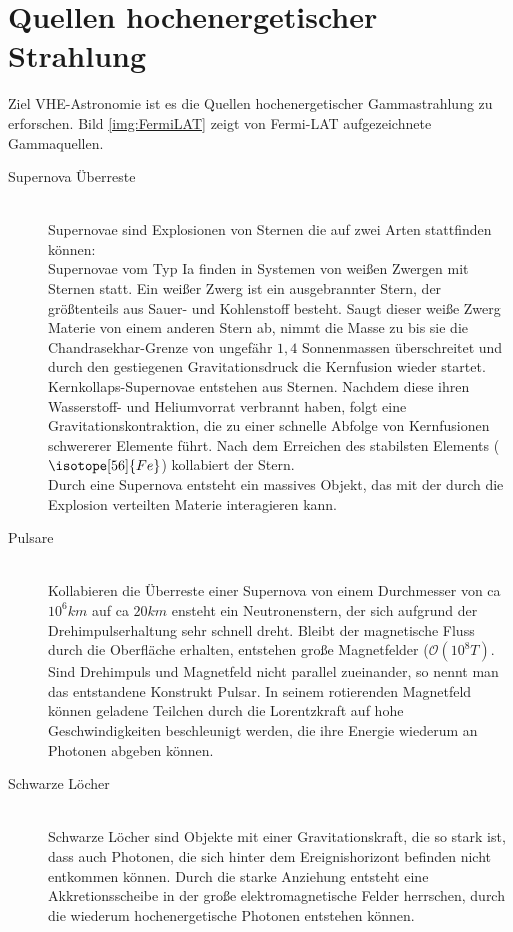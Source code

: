 \section{Quellen hochenergetischer Strahlung}
Ziel VHE-Astronomie ist es die Quellen hochenergetischer Gammastrahlung zu erforschen. Bild \ref{img:FermiLAT} zeigt von Fermi-LAT aufgezeichnete Gammaquellen.
\begin{description}
\item[Supernova Überreste]\hfill \\
Supernovae sind Explosionen von Sternen die auf zwei Arten stattfinden können:\\Supernovae vom Typ Ia finden in Systemen von weißen Zwergen mit Sternen statt. Ein weißer Zwerg ist ein ausgebrannter Stern, der größtenteils aus Sauer- und Kohlenstoff besteht. Saugt dieser weiße Zwerg Materie von einem anderen Stern ab, nimmt die Masse zu bis sie die Chandrasekhar-Grenze von ungefähr $1,4$ Sonnenmassen \cite{Grupen} überschreitet und durch den gestiegenen Gravitationsdruck die Kernfusion wieder startet.\\Kernkollaps-Supernovae entstehen aus Sternen. Nachdem diese ihren Wasserstoff- und Heliumvorrat verbrannt haben, folgt eine Gravitationskontraktion, die zu einer schnelle Abfolge von Kernfusionen schwererer Elemente führt. Nach dem Erreichen des stabilsten Elements ($\isotope[56]{Fe}$) kollabiert der Stern.\\Durch eine Supernova entsteht ein massives Objekt, das mit der durch die Explosion verteilten Materie interagieren kann.
\item[Pulsare]\hfill \\
Kollabieren die Überreste einer Supernova von einem Durchmesser von ca $10^6km$ auf ca $20km$ ensteht ein Neutronenstern, der sich aufgrund der Drehimpulserhaltung sehr schnell dreht. Bleibt der magnetische Fluss durch die Oberfläche erhalten, entstehen große Magnetfelder ($\mathcal{O}(10^8\unit{T})$\cite{Grupen}. Sind Drehimpuls und Magnetfeld nicht parallel zueinander, so nennt man das entstandene Konstrukt Pulsar. In seinem rotierenden Magnetfeld können geladene Teilchen durch die Lorentzkraft auf hohe Geschwindigkeiten beschleunigt werden, die ihre Energie wiederum an Photonen abgeben können.
\item[Schwarze Löcher]\hfill \\
Schwarze Löcher sind Objekte mit einer Gravitationskraft, die so stark ist, dass auch Photonen, die sich hinter dem Ereignishorizont befinden nicht entkommen können. Durch die starke Anziehung entsteht eine Akkretionsscheibe in der große elektromagnetische Felder herrschen, durch die wiederum hochenergetische Photonen entstehen können.

\end{description}
